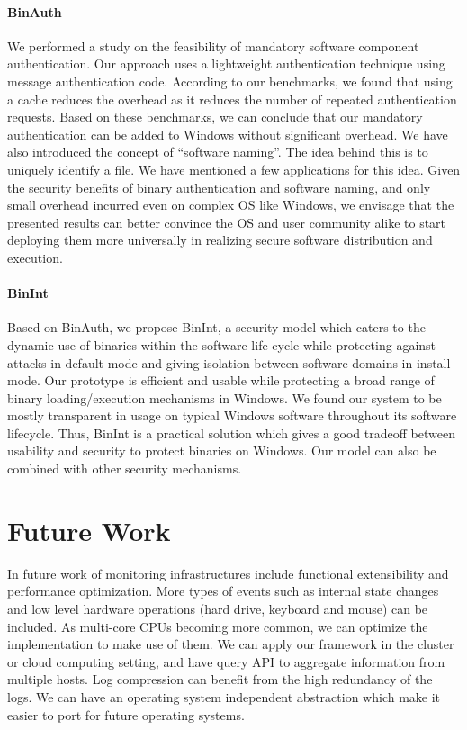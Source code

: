 \paragraph{BinAuth}
We performed a study on the feasibility of mandatory
software component authentication. Our approach uses a lightweight
authentication technique using message authentication code.
According to our benchmarks, we
found that using a cache reduces the overhead as it reduces
the number of repeated authentication requests.
Based on these benchmarks,
we can conclude that our mandatory authentication can be added to Windows
without significant overhead.
We have also introduced the concept of ``software naming''. The
idea behind this is to uniquely identify a file. We have mentioned a few
applications for this idea.
Given the security benefits of binary authentication and software naming,
and only small overhead incurred even on complex OS like Windows,
we envisage that the presented results can better convince
the OS and user community alike to start deploying them more universally
in realizing secure software distribution and execution.

\paragraph{BinInt}
Based on BinAuth, we propose BinInt, a security model which caters to the
dynamic use of binaries within the software life cycle
while protecting against attacks in default mode
and giving isolation between software domains in install mode.
Our prototype is efficient and usable while
protecting a broad range of binary loading/execution mechanisms in Windows.
We found our system to be mostly transparent in usage on typical
Windows software throughout its software lifecycle.
Thus, BinInt is a practical solution
which gives a good tradeoff between usability and security
to protect binaries on Windows.
Our model can also be combined with other security mechanisms.

\section{Future Work}
\label{sec:future}

In future work of monitoring infrastructures include functional
extensibility and performance optimization.
More types of events such as internal state changes and low level
hardware operations (hard drive, keyboard and mouse) can be included.
As multi-core CPUs becoming more common, we can optimize the
implementation to make use of them.
We can apply our framework in the cluster or cloud computing setting,
and have query API to aggregate information from multiple hosts.
Log compression can benefit from the high redundancy of the logs.
We can have an operating system independent
abstraction which make it easier to port for future operating systems.

